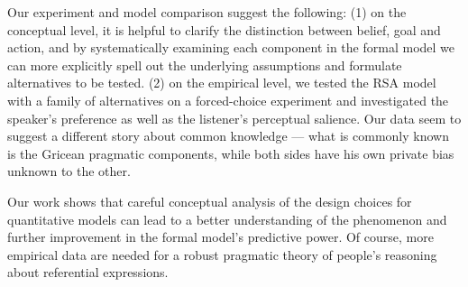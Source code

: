 Our experiment and model comparison suggest the following: (1) on the conceptual level, 
it is helpful to clarify the distinction between belief, goal and action, and by systematically examining each component in the formal model we can more explicitly spell out the underlying assumptions and formulate alternatives to be tested. (2) on the empirical level, we tested the RSA model with a family of alternatives on a forced-choice experiment and investigated the speaker's preference as well as the listener's perceptual salience. Our data seem to suggest a different story about common knowledge --- what is commonly known is the Gricean pragmatic components, while both sides have his own private bias unknown to the other.

Our work shows that careful conceptual analysis of the design choices for quantitative models can lead to a better understanding of the phenomenon and further improvement in the formal model's predictive power. Of course, more empirical data are needed for a robust pragmatic theory of people's reasoning about referential expressions. 


